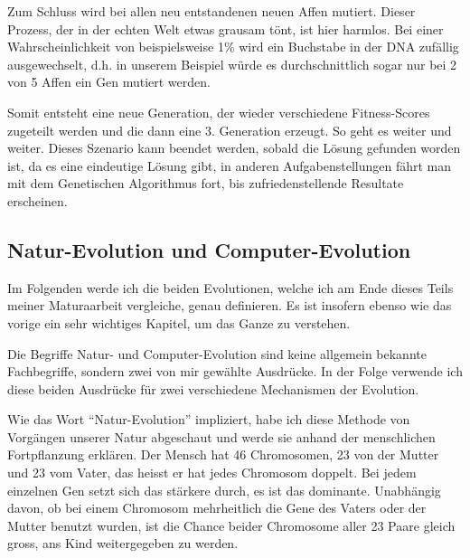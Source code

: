 \documentclass[11pt,a4paper,ngerman]{article}
\begin{document}
\bigskip
Zum Schluss wird bei allen neu entstandenen neuen Affen mutiert. Dieser Prozess, der in der echten Welt etwas grausam tönt, ist hier harmlos. Bei einer Wahrscheinlichkeit von beispielsweise 1\% wird ein Buchstabe in der DNA zufällig ausgewechselt, d.h. in unserem Beispiel würde es durchschnittlich sogar nur bei 2 von 5 Affen ein Gen mutiert werden.

\bigskip
\begin{center}
\end{center}

Somit entsteht eine neue Generation, der wieder verschiedene Fitness-Scores zugeteilt werden und die dann eine 3. Generation erzeugt. So geht es weiter und weiter. Dieses Szenario kann beendet werden, sobald die Lösung gefunden worden ist, da es eine eindeutige Lösung gibt, in anderen Aufgabenstellungen fährt man mit dem Genetischen Algorithmus fort, bis zufriedenstellende Resultate erscheinen.

\subsection{Natur-Evolution und Computer-Evolution}

Im Folgenden werde ich die beiden Evolutionen, welche ich am Ende dieses Teils meiner Maturaarbeit vergleiche, genau definieren. Es ist insofern ebenso wie das vorige ein sehr wichtiges Kapitel, um das Ganze zu verstehen.

\bigskip
Die Begriffe Natur- und Computer-Evolution sind keine allgemein bekannte Fachbegriffe, sondern zwei von mir gewählte Ausdrücke. In der Folge verwende ich diese beiden Ausdrücke für zwei verschiedene Mechanismen der Evolution.

\bigskip
Wie das Wort \enquote{Natur-Evolution} impliziert, habe ich diese Methode von Vorgängen unserer Natur abgeschaut und werde sie anhand der menschlichen Fortpflanzung erklären. Der Mensch hat 46 Chromosomen, 23 von der Mutter und 23 vom Vater, das heisst er hat jedes Chromosom doppelt. Bei jedem einzelnen Gen setzt sich das stärkere durch, es ist das dominante. Unabhängig davon, ob bei einem Chromosom mehrheitlich die Gene des Vaters oder der Mutter benutzt wurden, ist die Chance beider Chromosome aller 23 Paare gleich gross, ans Kind weitergegeben zu werden.
\end{document}
